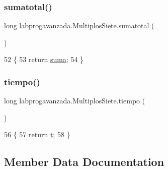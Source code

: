 \subsubsection{\texorpdfstring{sumatotal()}{sumatotal()}}
{\footnotesize\ttfamily long labprogavanzada.\+Multiplos\+Siete.\+sumatotal (\begin{DoxyParamCaption}{ }\end{DoxyParamCaption})\hspace{0.3cm}{\ttfamily [inline]}}


\begin{DoxyCode}
52                            \{
53         \textcolor{keywordflow}{return} \mbox{\hyperlink{classlabprogavanzada_1_1_multiplos_siete_a70d7ed627f4d0c7ebdae178469dbe698}{suma}};
54     \}
\end{DoxyCode}
\mbox{\label{classlabprogavanzada_1_1_multiplos_siete_a88623525cbef48cc4908acbb8d86096b}} 
\subsubsection{\texorpdfstring{tiempo()}{tiempo()}}
{\footnotesize\ttfamily long labprogavanzada.\+Multiplos\+Siete.\+tiempo (\begin{DoxyParamCaption}{ }\end{DoxyParamCaption})\hspace{0.3cm}{\ttfamily [inline]}}


\begin{DoxyCode}
56                         \{
57         \textcolor{keywordflow}{return} \mbox{\hyperlink{classlabprogavanzada_1_1_multiplos_siete_a406ca832e3291aaadc80bc4fc7cad9b0}{t}};
58     \}
\end{DoxyCode}


\subsection{Member Data Documentation}
\mbox{\label{classlabprogavanzada_1_1_multiplos_siete_a70d7ed627f4d0c7ebdae178469dbe698}} 
